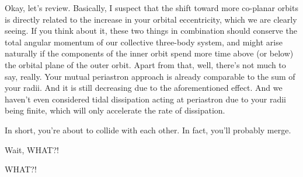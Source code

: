 \documentclass[main.tex]{subfiles}
\begin{document}
\par \Celaeno Okay, let's review.  Basically, I suspect that the shift toward more co-planar orbits is directly related to the increase in your orbital eccentricity, which we are clearly seeing.  If you think about it, these two things in combination should conserve the total angular momentum of our collective three-body system, and might arise naturally if the components of the inner orbit spend more time above (or below) the orbital plane of the outer orbit.  Apart from that, well, there's not much to say, really.  Your mutual periastron approach is already comparable to the sum of your radii.  And it is still decreasing due to the aforementioned effect.  And we haven't even considered tidal dissipation acting at periastron due to your radii being finite, which will only accelerate the rate of dissipation.

\par \Celaeno In short, you're about to collide with each other.  In fact, you'll probably merge.

\par \Taygete  Wait, WHAT?!

\par \Alcyone  WHAT?!
\end{document}
